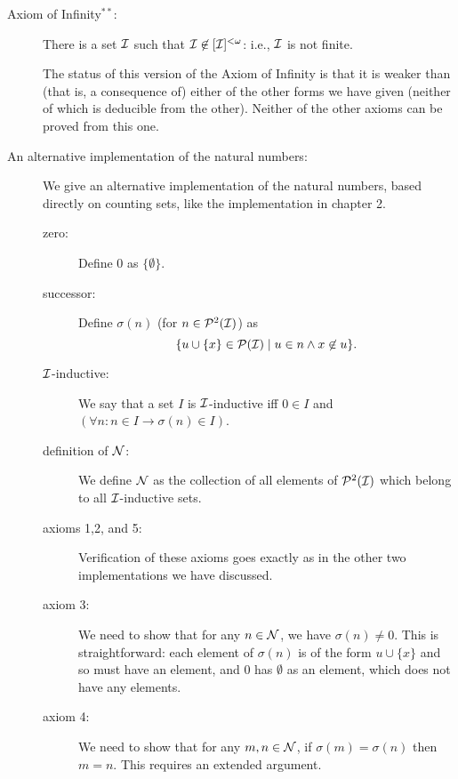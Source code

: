 \documentclass[12pt]{book}
\begin{document}
\begin{description}

\item[Axiom of Infinity$^{**}$:]  There is a set $\cal I$ such that $\cal I \not\in [{\cal I}]^{<\omega}$:  i.e., $\cal I$ is not finite.

The status of this version of the Axiom of Infinity is that it is weaker than (that is, a consequence of) either of the other forms we have given (neither of which is deducible from the other).  Neither of the other axioms can be proved from this one.

\item[An alternative implementation of the natural numbers:]

We give an alternative implementation of the natural numbers, based directly on counting sets, like the implementation in chapter 2.

\begin{description}

\item[zero:]  Define 0 as $\{\emptyset\}$.

\item[successor:]  Define $\sigma(n)$ (for $n \in {\cal P}^2({\cal I})$) as $$\{u \cup \{x\} \in {\cal P}({\cal I}) \mid u \in n \wedge x \not\in u\}.$$

\item[$\cal I$-inductive:]  We say that a set $I$ is $\cal I$-inductive iff $0 \in I$ and $(\forall n:n \in I \rightarrow \sigma(n) \in I)$.

\item[definition of $\cal N$:]  We define $\cal N$ as the collection of all elements of ${\cal P}^2({\cal I})$ which belong to all $\cal I$-inductive sets.

\item[axioms 1,2, and 5:]  Verification of these axioms goes exactly as in the other two implementations we have discussed.

\item[axiom 3:]  We need to show that for any $n \in {\cal N}$, we have $\sigma(n) \neq 0$.  This is straightforward:  each element of $\sigma(n)$ is of the form
$u \cup \{x\}$ and so must have an element, and 0 has $\emptyset$ as an element, which does not have any elements.

\item[axiom 4:]  We need to show that for any $m,n \in {\cal N}$, if $\sigma(m)=\sigma(n)$ then $m=n$.  This requires an extended argument.


\end{description}
\end{description}
\end{document}
